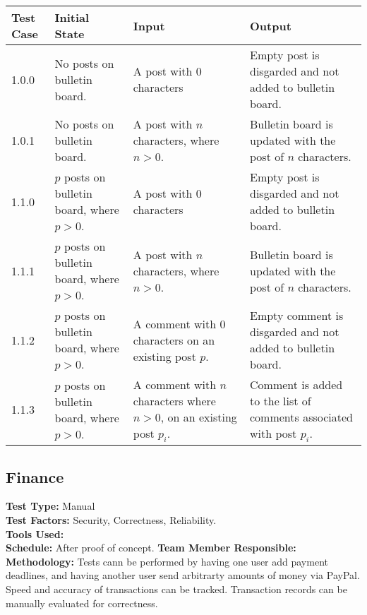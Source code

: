 \documentclass[12pt]{article}
\begin{document}
\begin{longtable}{|p{2cm}|p{3cm}|p{5cm}|p{5cm}|}
  \hline
  \textbf{Test Case} & \textbf{Initial State} & \textbf{Input} & \textbf{Output} \\ \hline
  1.0.0 & No posts on bulletin board. & A post with 0 characters & Empty post is disgarded and not added to bulletin board.\\
  \hline
  1.0.1 & No posts on bulletin board. & A post with $n$ characters, where $n > 0$. & Bulletin board is updated with the post of $n$ characters.\\
  \hline
  1.1.0 & $p$ posts on bulletin board, where $p > 0$. & A post with 0 characters & Empty post is disgarded and not added to bulletin board.\\
  \hline
  1.1.1 & $p$ posts on bulletin board, where $p > 0$. & A post with $n$ characters, where $n > 0$. & Bulletin board is updated with the post of $n$ characters.\\
  \hline
  1.1.2 & $p$ posts on bulletin board, where $p > 0$. & A comment with 0 characters on an existing post $p$. & Empty comment is disgarded and not added to bulletin board.\\
  \hline
  1.1.3 & $p$ posts on bulletin board, where $p > 0$. & A comment with $n$ characters where $n > 0$, on an existing post $p_i$. & Comment is added to the list of comments associated with post $p_i$.\\
  \hline
\end{longtable}
  
\subsection{Finance}
\textbf{Test Type:} Manual\\
\textbf{Test Factors:} Security, Correctness, Reliability. \\
\textbf{Tools Used:} \\
\textbf{Schedule:} After proof of concept.
\textbf{Team Member Responsible:} \\
\textbf{Methodology:} Tests cann be performed by having one user add payment deadlines, and having another user send arbitrarty amounts of money via PayPal. Speed and accuracy of transactions can be tracked. Transaction records can be manually evaluated for correctness.
\end{document}
